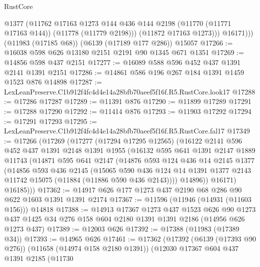 \begin{lexlean}{RustCore}
\begin{coremodule}
              @1377
              (@11762
                @17163
                @1273
                @144
                @436
                @144
                @2198
                (@11770 (@11771 @17163 @144))
                (@11778 (@11779 @2198)))
              (@11872 @17163 @1273)))
          @16171)))
    (@11983 (@17185 @68))
    (@6139 (@17189 @177 @286))
    @15057
@17266 := @16038 @598 @626 @13180 @2151 @2191 @90 @1345 @671 @1351
@17269 := @14856 @598 @437 @2151
@17277 := @16089 @588 @596 @452 @437 @1391 @2141 @1391 @2151
@17286 := @14861 @586 @196 @267 @184 @1391 @1459 @1523 @876 @14898
@17287 := LexLeanPreserve.C1b912f4fc4d4e14a28bfb70aeef5f16f.R5.RustCore.look17
@17288 := @17286 @17287
@17289 := @11391 @876
@17290 := @11899 @17289
@17291 := @17288 @17290
@17292 := @11414 @876
@17293 := @11903 @17292
@17294 := @17291 @17293
@17295 := LexLeanPreserve.C1b912f4fc4d4e14a28bfb70aeef5f16f.R5.RustCore.fal17
@17349 := @17266
    (@17269
      (@17277
        (@17294 @17295 @12565)
        (@16122
          @2141
          @596
          @452
          @437
          @1391
          @2148
          @1391
          @1955
          (@16132
            @595
            @641
            @1391
            @2147
            @1889
            @11743
            (@14871
              @595
              @641
              @2147
              (@14876
                @593
                @124
                @436
                @14
                @2145
                @1377
                (@14856
                  @593
                  @436
                  @2145
                  (@15065
                    @590
                    @436
                    @124
                    @14
                    @1391
                    @1377
                    @2143
                    @11742
                    @15075
                    (@11884 (@11886 @590 @436 @2143))))
                @14896))
            @16171)
          @16185)))
@17362 := @14917 @626 @177 @1273 @437 @2190 @68 @286 @90 @622 @1603 @1391 @1391 @2174
@17367 := @11596 (@11946 (@14931 (@11603 @156))) @14818
@17388 := @14913
    @17367
    @1273
    @437
    @1523
    @626
    @90
    @1273
    @437
    @1425
    @34
    @276
    @158
    @604
    @2180
    @1391
    @1391
    @2186
    (@14956 @626 @1273 @437)
@17389 := @12003 @626
@17392 := @17388 (@11983 (@17389 @34))
@17393 := @14965 @626
@17461 := @17362
    (@17392
      (@6139 (@17393 @90 @276))
      (@11658 (@14974 @158 @2180 @1391))
      (@12030
        @17367
        @604
        @437
        @1391
        @2185
        (@11730

\end{coremodule}
\end{lexlean}
